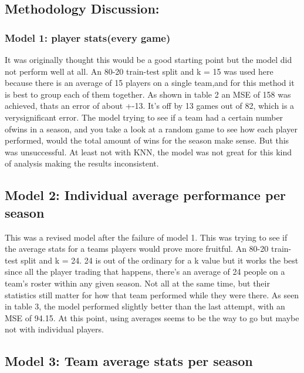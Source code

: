 \documentclass[11pt]{article}
\begin{document}
\subsection{Methodology Discussion:}

\subsubsection{Model 1: player stats(every game)}

 It was originally thought this would be a good starting point but the model
did not perform well at all. An 80-20 train-test split and k = 15 was used here because there is an average of 15 players on a single team,and for this method it is best to group each of them together. As shown in table 2 an MSE of 158 was achieved, thats an error of about +-13. It's off by 13 games out of 82, which is a verysignificant error. The model trying to see if a team had a certain number ofwins in a season, and you take a look at a random game to see how each player performed, would the total amount of wins for the season make sense. But this was unsuccessful. At least not with KNN, the model was not great for this kind of analysis making the results inconsistent.

 \subsection{Model 2: Individual average performance per season}
   

This was a revised model after the failure of model 1. This was trying to see if the average stats for a teams players would prove
more fruitful. An 80-20 train-test split and k = 24. 24 is out of
the ordinary for a k value but it works the best since 
 all the player trading that happens, there's an average of 24
people on a team's roster within any given season. Not all at the same
time, but their statistics still matter for how that team performed while they were there. As seen in table 3, the model performed slightly better than the last attempt, with an MSE of 94.15. At this point, using averages seems to be the way to go but maybe
not with individual players.

 \subsection{Model 3: Team average stats per season}
\end{document}
